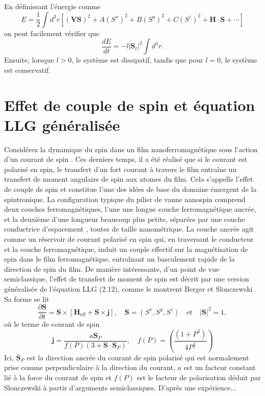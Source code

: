 \documentclass{article}
\begin{document}
	En définissant l'énergie comme
	\[
	E = \frac{1}{2} \int d^3r \left[(\mathbf{VS})^2 + A(S^{x})^2 + B(S^{y})^2 + C(S^{z})^2 + \mathbf{H} \cdot \mathbf{S} + \cdots \right] \tag{2.18}
	\]
	on peut facilement vérifier que
	\[
	\frac{dE}{dt} = -l \lvert \mathbf{S}_t \rvert^2 \int d^3r.
	\]
	Ensuite, lorsque $l > 0$, le système est dissipatif, tandis que pour $l = 0$, le système est conservatif.
	
	\section{Effet de couple de spin et équation LLG généralisée}
	
	Considérez la dynamique du spin dans un film nanoferromagnétique sous l'action d'un courant de spin \cite{ref5,ref6}. Ces derniers temps, il a été réalisé que si le courant est polarisé en spin, le transfert d'un fort courant à travers le film entraîne un transfert de moment angulaire de spin aux atomes du film. Cela s'appelle l'effet de couple de spin et constitue l'une des idées de base du domaine émergent de la spintronique. La configuration typique du pilier de vanne nanospin comprend deux couches ferromagnétiques, l'une une longue couche ferromagnétique ancrée, et la deuxième d'une longueur beaucoup plus petite, séparées par une couche conductrice d'espacement \cite{ref6}, toutes de taille nanométrique. La couche ancrée agit comme un réservoir de courant polarisé en spin qui, en traversant le conducteur et la couche ferromagnétique, induit un couple effectif sur la magnétisation de spin dans le film ferromagnétique, entraînant un basculement rapide de la direction de spin du film. De manière intéressante, d'un point de vue semiclassique, l'effet de transfert de moment de spin est décrit par une version généralisée de l'équation LLG (2.12), comme le montrent Berger \cite{ref7} et Slonczewski \cite{ref8}. Sa forme se lit
	\begin{equation}
	\frac{\partial \mathbf{S}}{\partial t} = \mathbf{S} \times [\mathbf{H}_{\text{eff}} + \mathbf{S} \times \mathbf{j}], \quad \mathbf{S} = (S^{x}, S^{y}, S^{z}) \quad \text{et} \quad \lvert \mathbf{S} \rvert^2 = 1, \tag{3.1}
	\end{equation}
	où le terme de courant de spin
	\begin{equation}
	\mathbf{j} = \frac{a\mathbf{S}_P}{f(P)(3 + \mathbf{S} \cdot \mathbf{S}_P)}, \quad f(P) = \left(\frac{(1 + P^3)}{4P^{\frac{3}{2}}}\right)
	\end{equation}
	Ici, $\mathbf{S}_P$ est la direction ancrée du courant de spin polarisé qui est normalement prise comme perpendiculaire à la direction du courant, $a$ est un facteur constant lié à la force du courant de spin et $f(P)$ est le facteur de polarisation déduit par Slonczewski \cite{ref8} à partir d'arguments semiclassiques. D'après une expérience...
	
\end{document}
